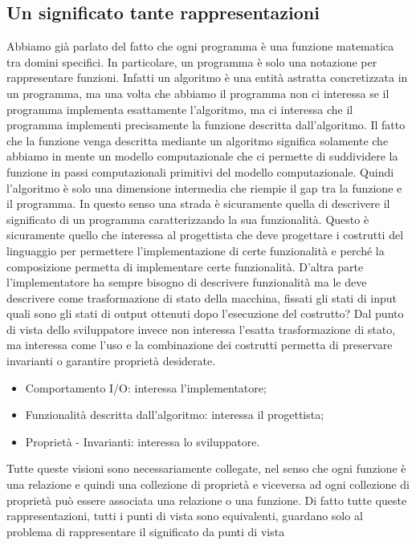 \documentclass[oneside,a4paper,11pt]{book}
\theoremstyle{italicstyle}
\theoremstyle{normStyle}
\begin{document}
\subsection{Un significato tante rappresentazioni}
Abbiamo già parlato del fatto che ogni programma è una
funzione matematica tra domini specifici. In particolare, un
programma è solo una notazione per rappresentare
funzioni. Infatti un algoritmo è una entità astratta
concretizzata in un programma, ma una volta che abbiamo
il programma non ci interessa se il programma implementa
esattamente l’algoritmo, ma ci interessa che il programma
implementi precisamente la funzione descritta
dall'algoritmo. Il fatto che la funzione venga descritta
mediante un algoritmo significa solamente che abbiamo in
mente un modello computazionale che ci permette
di suddividere la funzione in passi computazionali primitivi del modello 
computazionale. 
Quindi l’algoritmo è solo una 
dimensione intermedia che riempie il gap tra la funzione e
il programma. In questo senso una strada è sicuramente
quella di descrivere il significato di un programma
caratterizzando la sua funzionalità. Questo è sicuramente
quello che interessa al progettista che deve progettare i
costrutti del linguaggio per permettere l’implementazione
di certe funzionalità e perché la composizione permetta di
implementare certe funzionalità. D’altra parte
l'implementatore ha sempre bisogno di descrivere
funzionalità ma le deve descrivere come trasformazione di
stato della macchina, fissati gli stati di input quali sono gli
stati di output ottenuti dopo l’esecuzione del costrutto? Dal
punto di vista dello sviluppatore invece non interessa
l’esatta trasformazione di stato, ma interessa come l’uso e
la combinazione dei costrutti permetta di preservare invarianti
o garantire proprietà desiderate.
\begin{itemize}
  \item Comportamento I/O: interessa l'implementatore;
  \item Funzionalità descritta dall'algoritmo: interessa il progettista;
  \item Proprietà - Invarianti: interessa lo sviluppatore.
\end{itemize}
Tutte queste visioni sono necessariamente collegate, nel senso che ogni funzione
è una relazione e quindi una collezione di proprietà e viceversa ad ogni
collezione di proprietà può essere associata una relazione o una funzione.
Di fatto tutte queste rappresentazioni, tutti i punti di vista sono equivalenti,
guardano solo al problema di rappresentare il significato da punti di vista
\end{document}
